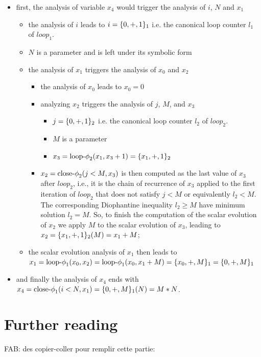 \begin{itemize}
\item first, the analysis of variable $x_4$ would trigger the analysis
  of $i$, $N$ and $x_1$
  \begin{itemize}
  \item the analysis of $i$ leads to $i = \{0, +, 1\}_1$ i.e. the canonical loop counter $l_1$ of $loop_1$.
  \item $N$ is a parameter and is left under its symbolic form
  \item the analysis of $x_1$ triggers the analysis of $x_0$ and $x_2$
    \begin{itemize}
    \item the analysis of $x_0$ leads to $x_0 = 0$
    \item analyzing $x_2$ triggers the analysis of $j$, $M$, and $x_3$
      \begin{itemize}
      \item $j = \{0, +, 1\}_2$ i.e. the canonical loop counter $l_2$ of $loop_2$.
      \item $M$ is a parameter
      \item $x_3 = \textrm{loop-$\phi$}_2 (x_1, x_3 + 1) = \{x_1, +, 1\}_2$
      \end{itemize}
    \item $x_2 = \textrm{close-$\phi$}_2 (j < M, x_3)$ is then computed as the last value of $x_3$ after
      $loop_2$, i.e., it is the chain of recurrence of $x_3$ applied
      to the first iteration of $loop_2$ that does not satisfy $j < M$ or equivalently $l_2<M$. The corresponding Diophantine inequality $l_2\geq M$  have minimum solution $l_2=M$. So, to finish the computation of the scalar evolution of
      $x_2$ we apply $M$ to the scalar evolution of $x_3$, leading
      to $x_2 = \{x_1, +, 1\}_2 (M) = x_1 + M$;
    \end{itemize}
  \item the scalar evolution analysis of $x_1$ then leads to $x_1 =
    \textrm{loop-$\phi$}_1 (x_0, x_2) = \textrm{loop-$\phi$}_1 (x_0, x_1 + M) = \{x_0, +, M\}_1 =
    \{0, +, M\}_1$
  \end{itemize}
\item and finally the analysis of $x_4$ ends with $x_4 = \textrm{close-$\phi$}_1 (i
  < N, x_1) = \{0, +, M\}_1 (N) = M * N$.
\end{itemize}


\section{Further reading}
FAB: des copier-coller pour remplir cette partie:\\

